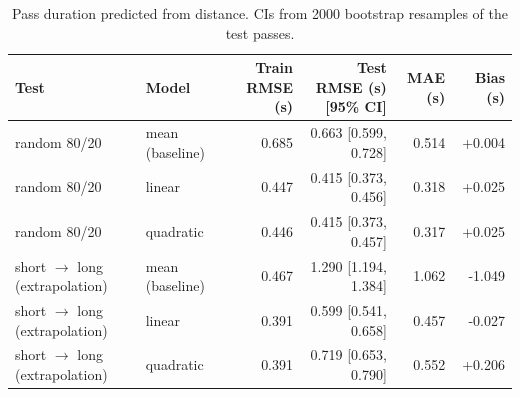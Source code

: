 \begin{table}[h]
\centering\small
\begin{tabular}{llrrrr}
\hline
Test & Model & Train RMSE (s) & Test RMSE (s) [95\% CI] & MAE (s) & Bias (s) \\
\hline
random 80/20 & mean (baseline) & 0.685 & 0.663 [0.599, 0.728] & 0.514 & +0.004 \\
random 80/20 & linear & 0.447 & 0.415 [0.373, 0.456] & 0.318 & +0.025 \\
random 80/20 & quadratic & 0.446 & 0.415 [0.373, 0.457] & 0.317 & +0.025 \\
short $\to$ long (extrapolation) & mean (baseline) & 0.467 & 1.290 [1.194, 1.384] & 1.062 & -1.049 \\
short $\to$ long (extrapolation) & linear & 0.391 & 0.599 [0.541, 0.658] & 0.457 & -0.027 \\
short $\to$ long (extrapolation) & quadratic & 0.391 & 0.719 [0.653, 0.790] & 0.552 & +0.206 \\
\hline
\end{tabular}
\caption{Pass duration predicted from distance. CIs from 2000 bootstrap resamples of the test passes.}
\label{tab:part3}
\end{table}
